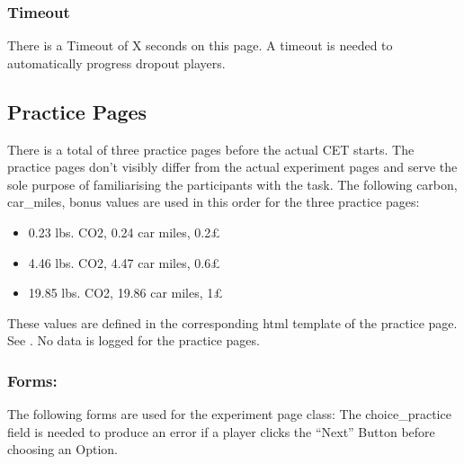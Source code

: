 \documentclass[letterpaper,10pt,english]{sphinxmanual}
\let\sphinxpxdimen\pdfpxdimen\else\newdimen\sphinxpxdimen
\begin{document}
\subsubsection{Timeout}
\label{\detokenize{pages:timeout}}
There is a Timeout of X seconds on this page. A timeout is needed to automatically progress dropout players.


\subsection{Practice Pages}
\label{\detokenize{pages:practice-pages}}
There is a total of three practice pages before the actual CET starts. The practice pages don’t visibly differ from
the actual experiment pages and serve the sole purpose of familiarising the participants with the task.
The following carbon, car\_miles, bonus values are used in this order for the three practice pages:
\begin{itemize}
\item {} 
0.23 lbs. CO2, 0.24 car miles, 0.2£

\item {} 
4.46 lbs. CO2, 4.47 car miles, 0.6£

\item {} 
19.85 lbs. CO2, 19.86 car miles, 1£

\end{itemize}

These values are defined in the corresponding html template of the practice page. See {\hyperref[\detokenize{templates:templates-ref}]{}}.
No data is logged for the practice pages.

\noindent{\hspace*{\fill}\sphinxincludegraphics[width=701\sphinxpxdimen,height=317\sphinxpxdimen]{{practice1}.png}\hspace*{\fill}}


\subsubsection{Forms:}
\label{\detokenize{pages:forms}}
The following forms are used for the experiment page class:
The choice\_practice field is needed to produce an error if a player clicks the “Next” Button before choosing an Option.

\begin{sphinxVerbatim}[commandchars=\\\{\}]
 
      
      \PYG{p}{[}\PYG{p}{]}  
\end{sphinxVerbatim}
\end{document}
